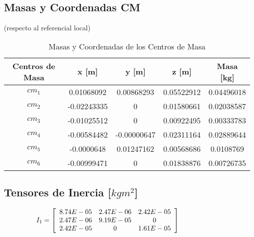 \subsection{Masas y Coordenadas CM}

\begin{table}[H]
\centering
\label{tb:masas_cm}
    \begin{center}
    \caption{Masas y Coordenadas de los Centros de Masa} 
    (respecto al referencial local)
    \centering
    \bigskip
 
        \begin{tabular}{cccc||c}
        {Centros de Masa}& x [m] & y [m] & z [m] & Masa [kg]\\
        \hline
        $cm_1$ & 0.01068092    & 0.00868293   & 0.05522912 & 0.04496018 \\
        $cm_2$ & -0.02243335   & 0            & 0.01580661 & 0.02038587 \\
        $cm_3$ & -0.01025512   & 0            & 0.00922495 & 0.00333783 \\ 
        $cm_4$ & -0.00584482   & -0.00000647  & 0.02311164 & 0.02889644 \\
        $cm_5$ & -0.0000648    & 0.01247162   & 0.00568686 & 0.0108769  \\
        $cm_6$ & -0.00999471   & 0            & 0.01838876 & 0.00726735 \\
        \hline 

        \end{tabular}
    \end{center}
    \label{ref:TablaCentrosMasa}
\end{table}

\subsection{Tensores de Inercia [$kgm^2$]} \label{Tensores}

\begin{equation*}
    \hspace{-10mm}
    I_1 = \left[
        \begin{array}{ccc}
        8.74E-05&2.47E-06&2.42E-05\\
        2.47E-06&9.19E-05&0\\     
        2.42E-05&0&1.61E-05\\
        \end{array}\right]\hspace{10mm}
\end{equation*}

